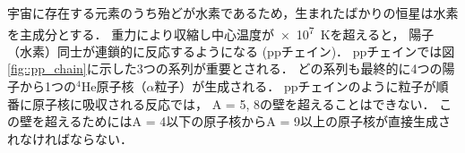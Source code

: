 \documentclass[../master]{subfiles}
\begin{document}
宇宙に存在する元素のうち殆どが水素であるため，生まれたばかりの恒星は水素を主成分とする．
重力により収縮し中心温度が\SI{e7}{\kelvin}を超えると，
陽子（水素）同士が連鎖的に反応するようになる (ppチェイン)．
ppチェインでは図\ref{fig::pp_chain}に示した3つの系列が重要とされる．
どの系列も最終的に4つの陽子から1つの${}^{4}\mathrm{He}$原子核（$\alpha$粒子）が生成される．
ppチェインのように粒子が順番に原子核に吸収される反応では，
A = 5, 8の壁を超えることはできない．
この壁を超えるためにはA = 4以下の原子核からA = 9以上の原子核が直接生成されなければならない．
\end{document}
